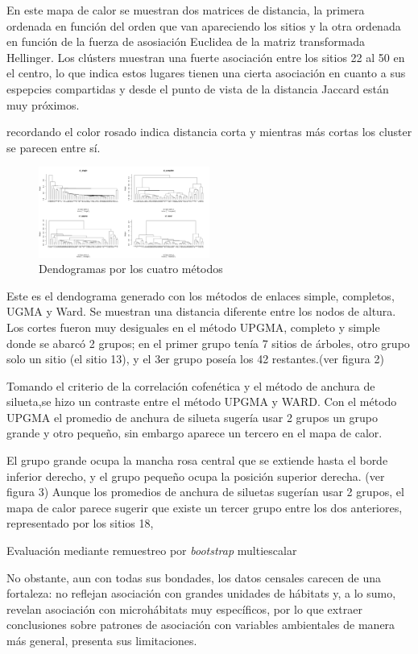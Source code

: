 \documentclass[11pt,]{article}
\begin{document}
En este mapa de calor se muestran dos matrices de distancia, la primera
ordenada en función del orden que van apareciendo los sitios y la otra
ordenada en función de la fuerza de asosiación Euclidea de la matriz
transformada Hellinger. Los clústers muestran una fuerte asociación
entre los sitios 22 al 50 en el centro, lo que indica estos lugares
tienen una cierta asociación en cuanto a sus espepcies compartidas y
desde el punto de vista de la distancia Jaccard están muy próximos.

recordando el color rosado indica distancia corta y mientras más cortas
los cluster se parecen entre sí.

\begin{figure}
\centering
\includegraphics[width=0.50000\textwidth]{4_dendogramas.png}
\caption{Dendogramas por los cuatro métodos}
\end{figure}

Este es el dendograma generado con los métodos de enlaces simple,
completos, UGMA y Ward. Se muestran una distancia diferente entre los
nodos de altura. Los cortes fueron muy desiguales en el método UPGMA,
completo y simple donde se abarcó 2 grupos; en el primer grupo tenía 7
sitios de árboles, otro grupo solo un sitio (el sitio 13), y el 3er
grupo poseía los 42 restantes.(ver figura 2)

Tomando el criterio de la correlación cofenética y el método de anchura
de silueta,se hizo un contraste entre el método UPGMA y WARD. Con el
método UPGMA el promedio de anchura de silueta sugería usar 2 grupos un
grupo grande y otro pequeño, sin embargo aparece un tercero en el mapa
de calor.

El grupo grande ocupa la mancha rosa central que se extiende hasta el
borde inferior derecho, y el grupo pequeño ocupa la posición superior
derecha. (ver figura 3) Aunque los promedios de anchura de siluetas
sugerían usar 2 grupos, el mapa de calor parece sugerir que existe un
tercer grupo entre los dos anteriores, representado por los sitios 18,

Evaluación mediante remuestreo por \emph{bootstrap} multiescalar

No obstante, aun con todas sus bondades, los datos censales carecen de
una fortaleza: no reflejan asociación con grandes unidades de hábitats
y, a lo sumo, revelan asociación con microhábitats muy específicos, por
lo que extraer conclusiones sobre patrones de asociación con variables
ambientales de manera más general, presenta sus limitaciones.
\end{document}
